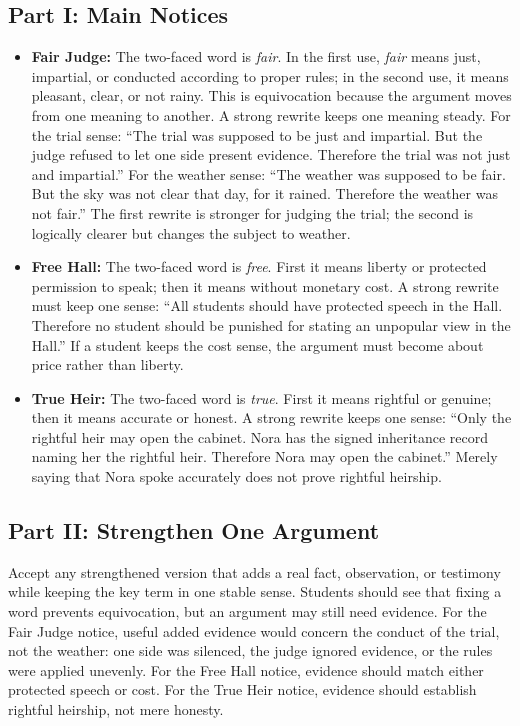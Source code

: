 \documentclass[12pt]{article}
\begin{document}
\subsection*{Part I: Main Notices}
\begin{itemize}[leftmargin=*]
\item \textbf{Fair Judge:} The two-faced word is \textit{fair}. In the first use, \textit{fair} means just, impartial, or conducted according to proper rules; in the second use, it means pleasant, clear, or not rainy. This is equivocation because the argument moves from one meaning to another. A strong rewrite keeps one meaning steady. For the trial sense: ``The trial was supposed to be just and impartial. But the judge refused to let one side present evidence. Therefore the trial was not just and impartial.'' For the weather sense: ``The weather was supposed to be fair. But the sky was not clear that day, for it rained. Therefore the weather was not fair.'' The first rewrite is stronger for judging the trial; the second is logically clearer but changes the subject to weather.
\item \textbf{Free Hall:} The two-faced word is \textit{free}. First it means liberty or protected permission to speak; then it means without monetary cost. A strong rewrite must keep one sense: ``All students should have protected speech in the Hall. Therefore no student should be punished for stating an unpopular view in the Hall.'' If a student keeps the cost sense, the argument must become about price rather than liberty.
\item \textbf{True Heir:} The two-faced word is \textit{true}. First it means rightful or genuine; then it means accurate or honest. A strong rewrite keeps one sense: ``Only the rightful heir may open the cabinet. Nora has the signed inheritance record naming her the rightful heir. Therefore Nora may open the cabinet.'' Merely saying that Nora spoke accurately does not prove rightful heirship.
\end{itemize}

\subsection*{Part II: Strengthen One Argument}
Accept any strengthened version that adds a real fact, observation, or testimony while keeping the key term in one stable sense. Students should see that fixing a word prevents equivocation, but an argument may still need evidence. For the Fair Judge notice, useful added evidence would concern the conduct of the trial, not the weather: one side was silenced, the judge ignored evidence, or the rules were applied unevenly. For the Free Hall notice, evidence should match either protected speech or cost. For the True Heir notice, evidence should establish rightful heirship, not mere honesty.
\end{document}

